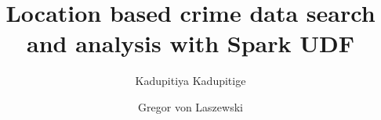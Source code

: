 

\def\paperstatus{100} %
\def\paperchapter{REST} %
\def\hid{hid-sp18-409} %
\def\volume{9} %

\def\locator{\hid, Volume: \volume, Chapter: \paperchapter, Status: \paperstatus. \newline}

\title{Location based crime data search and analysis with Spark UDF}


\author{Kadupitiya Kadupitige}

\author{Gregor von Laszewski}


\renewcommand{\shortauthors}{G. v. Laszewski}


